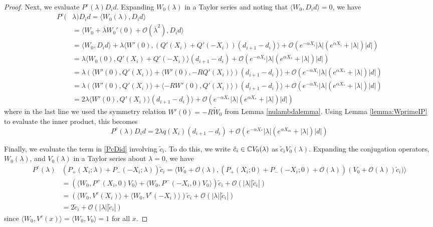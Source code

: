 \documentclass[thesis.tex]{subfiles}
\begin{document}
\begin{lemma}
\begin{proof}
Next, we evaluate $P^c(\lambda)D_i d$. Expanding $W_0(\lambda)$ in a Taylor series and noting that $\langle W_0, D_i d \rangle = 0$, we have 
\begin{align*}
P^c(&\lambda)D_i d = \langle W_0(\lambda), D_i d \rangle \\
&= \langle W_0 + \overline{\lambda} W_0'(0) + \mathcal{O}(\overline{\lambda}^2), D_i d \rangle \\
&= \langle W_0, D_i d \rangle + \lambda \langle W'(0), (Q'(X_i) + Q'(-X_i))(d_{i+1} - d_i ) \rangle + \mathcal{O}(e^{-\alpha X_i} |\lambda|(e^{\alpha X_i} + |\lambda|)|d|) \\
&= \lambda \langle W_0(0), Q'(X_i) + Q'(-X_i) \rangle (d_{i+1} - d_i ) + \mathcal{O}(e^{-\alpha X_i} |\lambda|(e^{\alpha X_*} + |\lambda|)|d|) \\
&= \lambda ( \langle W'(0), Q'(X_i) \rangle + \langle W'(0), -R Q'(X_i)\rangle )(d_{i+1} - d_i ) \rangle + \mathcal{O}(e^{-\alpha X_i} |\lambda|(e^{\alpha X_*} + |\lambda|)|d|)\\
&= \lambda \left( \langle W'(0), Q'(X_i) \rangle + \langle -R W'(0), Q'(X_i)\rangle \right)(d_{i+1} - d_i ) \rangle + \mathcal{O}(e^{-\alpha X_i} |\lambda|(e^{\alpha X_*} + |\lambda|)|d|) \\
&= 2 \lambda \langle W'(0), Q'(X_i) \rangle (d_{i+1} - d_i ) \rangle + \mathcal{O}(e^{-\alpha X_*} |\lambda|(e^{\alpha X_*} + |\lambda|)|d|)
\end{align*}
where in the last line we used the symmetry relation $W'(0) = -R \tilde{W}_0$ from Lemma \ref{nulambdalemma}. Using Lemma \ref{lemma:WprimeIP} to evaluate the inner product, this becomes
\begin{equation}\label{PcDid2}
P^c(\lambda)D_i d = 2 \lambda q(X_i) (d_{i+1} - d_i ) + \mathcal{O}(e^{-\alpha X_*} |\lambda|(e^{\alpha X_m} + |\lambda|)|d|)
\end{equation}

Finally, we evaluate the term in \cref{PcDid} involving $\tilde{c}_i$. To do this, we write $\tilde{c}_i \in \mathbb{C} V_0(\lambda)$ as $\tilde{c}_i V_0(\lambda)$. Expanding the conjugation operators, $W_0(\lambda)$, and $V_0(\lambda)$ in a Taylor series about $\lambda = 0$, we have
\begin{align*}
P^c(\lambda) &(P_+(X_i; \lambda) + P_-(-X_i; \lambda))\tilde{c}_i 
= \langle W_0 + \mathcal{O}(\lambda), (P_+(X_i; 0) + P_-(-X_i; 0) + \mathcal{O}(\lambda))(V_0 + \mathcal{O}(\lambda))\tilde{c}_i) \rangle \\
&= \left( \langle W_0, P^+(X_i, 0)V_0 \rangle + \langle W_0, P^-(-X_i, 0)V_0 \rangle \right)\tilde{c}_i + \mathcal{O}(|\lambda||\tilde{c}_i|) \\
&= \left( \langle W_0, V^c(X_i) \rangle + \langle W_0, V^c(-X_i) \rangle \right)\tilde{c}_i + \mathcal{O}(|\lambda||\tilde{c}_i|) \\
&= 2 \tilde{c}_i + \mathcal{O}(|\lambda||\tilde{c}_i|)
\end{align*}
since $\langle W_0, V^c(x) \rangle = \langle W_0, V_0 \rangle = 1$ for all $x$. 


\end{proof}
\end{lemma}
\end{document}
